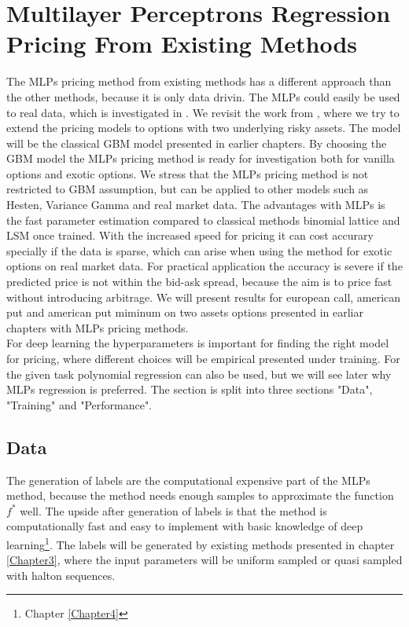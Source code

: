 \section{Multilayer Perceptrons Regression Pricing From Existing Methods}
The MLPs pricing method from existing methods has a different approach than the other methods, because it is only data drivin. The MLPs could easily be used to real data, which is investigated in \parencite{GasparRaquel20}. We revisit the work from \parencite{HirsaAli2019}, where we try to extend the pricing models to options with two underlying risky assets. The model will be the classical GBM model presented in earlier chapters. By choosing the GBM model the MLPs pricing method is ready for investigation both for vanilla options and exotic options. We stress that the MLPs pricing method is not restricted to GBM assumption, but can be applied to other models such as Hesten, Variance Gamma and real market data. The advantages with MLPs is the fast parameter estimation compared to classical methods binomial lattice and LSM once trained. With the increased speed for pricing it can cost accurary specially if the data is sparse, which can arise when using the method for exotic options on real market data. For practical application the accuracy is severe if the predicted price is not within the bid-ask spread, because the aim is to price fast without introducing arbitrage. We will present results for european call, american put and american put miminum on two assets options presented in earliar chapters with MLPs pricing methods.\\

For deep learning the hyperparameters is important for finding the right model for pricing, where different choices will be empirical presented under training. For the given task polynomial regression can also be used, but we will see later why MLPs regression is preferred. The section is split into three sections "Data", "Training" and "Performance".

\subsection{Data}
The generation of labels are the computational expensive part of the MLPs method, because the method needs enough samples to approximate the function $f^*$ well. The upside after generation of labels is that the method is computationally fast and easy to implement with basic knowledge of deep learning\footnote{Chapter \ref{Chapter4}}. The labels will be generated by existing methods presented in chapter \ref{Chapter3}, where the input parameters will be uniform sampled or quasi sampled with halton sequences.\\

